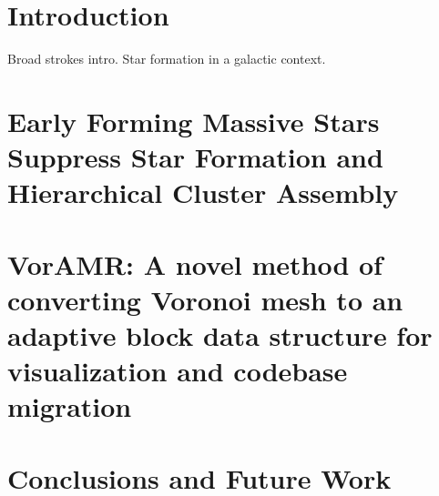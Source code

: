 \documentclass{drexel-thesis}
\begin{document}
\begin{thesis}

\chapter{Introduction}
Broad strokes intro. Star formation in a galactic context.
\section{}

\chapter{Early Forming Massive Stars Suppress Star Formation and Hierarchical Cluster Assembly}

\chapter{VorAMR: A novel method of converting Voronoi mesh to an adaptive block data structure for visualization and codebase migration}

\chapter{Conclusions and Future Work}

\end{thesis}


\appendix %

\begin{vita} %
\end{vita}
\end{document}
